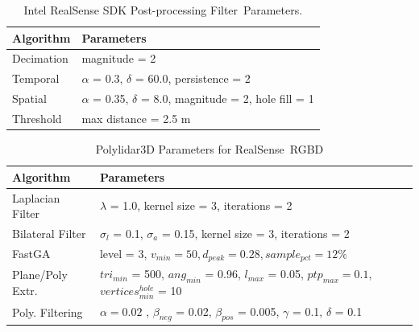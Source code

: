 \begin{table}[H]
\centering
\caption{Intel RealSense SDK Post-processing Filter~Parameters.}\label{table:ch3_realsense_parameters}
\begin{tabular}{@{}ll@{}}
\toprule
\textbf{Algorithm}        & \textbf{Parameters}                                                          \\ \midrule
Decimation     & magnitude = 2   \\
Temporal      & $\alpha$ = 0.3, $\delta$ = 60.0, persistence = 2 \\
Spatial       & $\alpha$ = 0.35, $\delta$ = 8.0, magnitude = 2, hole fill = 1  \\
Threshold     & max distance = 2.5 m  \\ \bottomrule
\end{tabular}
\end{table}
\unskip

\begin{table}[H]
\centering
\caption{Polylidar3D Parameters for RealSense~\ac{RGBD}}\label{table:ch3_rgbd_parameters}
\begin{tabular}{@{}ll@{}}
\toprule
\textbf{Algorithm}        & \textbf{Parameters}                                                          \\ \midrule
Laplacian Filter & $\lambda$ = 1.0, kernel size = 3, iterations = 2   \\
Bilateral Filter & $\sigma_l$ = 0.1, $\sigma_a$ = 0.15, kernel size = 3, iterations = 2 \\
FastGA           & level = 3,  $v_{min} = 50, d_{peak} = 0.28, sample_{pct} = 12\%$            \\
Plane/Poly Extr.      & $tri_{min}$ = 500, $ang_{min}$ = 0.96, $l_{max}$ = 0.05, $ptp_{max} = 0.1$, $vertices^{hole}_{min}$ = 10  \\
Poly. Filtering      & $\alpha = 0.02$ , $\beta_{neg}$ = 0.02, $\beta_{pos}$ = 0.005, $\gamma$ = 0.1, $\delta$ = 0.1      \\ \bottomrule
\end{tabular}
\end{table}


